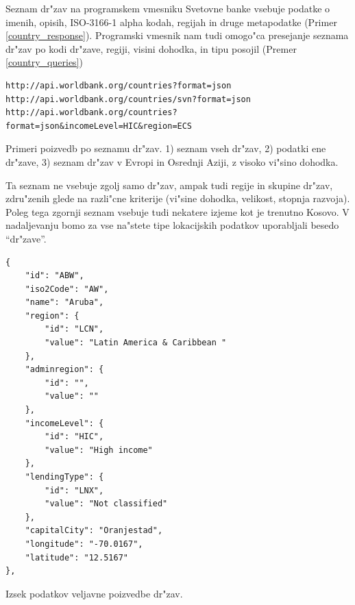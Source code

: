 Seznam dr"zav na programskem vmesniku Svetovne banke vsebuje podatke o imenih, 
opisih, ISO-3166-1 alpha kodah, regijah in druge metapodatke 
(Primer \ref{country_response}). Programski
vmesnik nam tudi omogo"ca presejanje seznama dr"zav po kodi dr"zave, regiji,
visini dohodka, in tipu posojil (Premer \ref{country_queries})


\begin{snippet}
\begin{center}
\begin{lstlisting}
http://api.worldbank.org/countries?format=json
http://api.worldbank.org/countries/svn?format=json
http://api.worldbank.org/countries?format=json&incomeLevel=HIC&region=ECS
\end{lstlisting}
\end{center}
\caption{Primeri poizvedb po seznamu dr"zav.
1) seznam vseh dr"zav, 2) podatki ene dr"zave,
3) seznam dr"zav v Evropi in Osrednji Aziji, z visoko vi"sino dohodka.}
\label{country_queries}
\end{snippet} 

Ta seznam ne vsebuje zgolj samo dr"zav, ampak tudi regije in skupine dr"zav, 
zdru"zenih glede na razli"cne kriterije (vi"sine dohodka, velikost, stopnja
razvoja). Poleg tega zgornji seznam vsebuje tudi nekatere izjeme kot je trenutno
Kosovo. V nadaljevanju bomo za vse na"stete tipe lokacijskih podatkov
uporabljali besedo ``dr"zave''. 

\begin{snippet}
\begin{center}
\begin{lstlisting}
{
    "id": "ABW",
    "iso2Code": "AW",
    "name": "Aruba",
    "region": {
        "id": "LCN",
        "value": "Latin America & Caribbean "
    },
    "adminregion": {
        "id": "",
        "value": ""
    },
    "incomeLevel": {
        "id": "HIC",
        "value": "High income"
    },
    "lendingType": {
        "id": "LNX",
        "value": "Not classified"
    },
    "capitalCity": "Oranjestad",
    "longitude": "-70.0167",
    "latitude": "12.5167"
},
\end{lstlisting}
\end{center}
\caption[some]{Izsek podatkov veljavne poizvedbe dr"zav.}
\label{country_response}
\end{snippet} 


